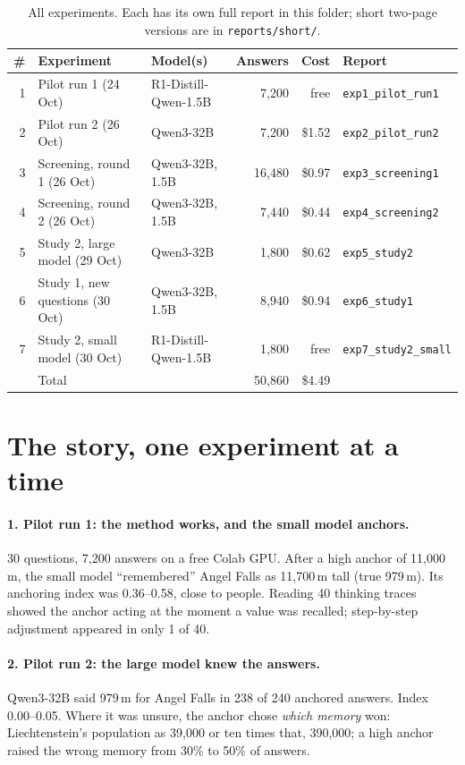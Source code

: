 \documentclass[11pt,a4paper]{article}
\begin{document}
\begin{table}[ht]
\centering\small
\begin{tabular}{@{}rp{4.2cm}p{3.3cm}rrl@{}}
\toprule
\# & Experiment & Model(s) & Answers & Cost & Report \\
\midrule
1 & Pilot run 1 (24 Oct) & R1-Distill-Qwen-1.5B & 7,200 & free & \texttt{exp1\_pilot\_run1} \\
2 & Pilot run 2 (26 Oct) & Qwen3-32B & 7,200 & \$1.52 & \texttt{exp2\_pilot\_run2} \\
3 & Screening, round 1 (26 Oct) & Qwen3-32B, 1.5B & 16,480 & \$0.97 & \texttt{exp3\_screening1} \\
4 & Screening, round 2 (26 Oct) & Qwen3-32B, 1.5B & 7,440 & \$0.44 & \texttt{exp4\_screening2} \\
5 & Study 2, large model (29 Oct) & Qwen3-32B & 1,800 & \$0.62 & \texttt{exp5\_study2} \\
6 & Study 1, new questions (30 Oct) & Qwen3-32B, 1.5B & 8,940 & \$0.94 & \texttt{exp6\_study1} \\
7 & Study 2, small model (30 Oct) & R1-Distill-Qwen-1.5B & 1,800 & free & \texttt{exp7\_study2\_small} \\
\midrule
 & Total & & 50,860 & \$4.49 & \\
\bottomrule
\end{tabular}
\caption{All experiments. Each has its own full report in this folder; short two-page versions are in \texttt{reports/short/}.}
\end{table}

\section{The story, one experiment at a time}

\paragraph{1. Pilot run 1: the method works, and the small model anchors.} 30 questions, 7,200 answers on a free Colab GPU. After a high anchor of 11,000\,m, the small model \enquote{remembered} Angel Falls as 11,700\,m tall (true 979\,m). Its anchoring index was 0.36--0.58, close to people. Reading 40 thinking traces showed the anchor acting at the moment a value was recalled; step-by-step adjustment appeared in only 1 of 40.

\paragraph{2. Pilot run 2: the large model knew the answers.} Qwen3-32B said 979\,m for Angel Falls in 238 of 240 anchored answers. Index 0.00--0.05. Where it was unsure, the anchor chose \emph{which memory} won: Liechtenstein's population as 39,000 or ten times that, 390,000; a high anchor raised the wrong memory from 30\% to 50\% of answers.
\end{document}
